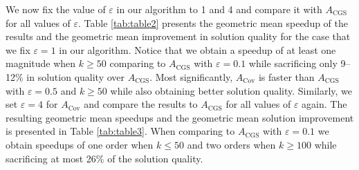         

    We now fix the value of $\varepsilon$ in our algorithm to 1 and 4 and compare it with $A_{\text{CGS}}$ for all values of $\varepsilon$. Table \ref{tab:table2} presents the geometric mean speedup of the results and the geometric mean improvement in solution quality for the case that we fix $\varepsilon = 1$ in our algorithm. Notice that we obtain a speedup of at least one magnitude when $k \geq 50$ comparing to $A_{\text{CGS}}$ with $\varepsilon = 0.1$ while sacrificing only 9--12\% in solution quality over $A_{\text{CGS}}$. Most significantly, $A_{\text{Cov}}$ is faster than $A_{\text{CGS}}$ with $\varepsilon = 0.5$ and $k \geq 50$ while also obtaining better solution quality. Similarly, we set $\varepsilon = 4$ for $A_{\text{Cov}}$ and compare the results to $A_{\text{CGS}}$ for all values of $\varepsilon$ again. The resulting geometric mean speedups and the geometric mean solution improvement is presented in Table \ref{tab:table3}. When comparing to $A_{\text{CGS}}$ with $\varepsilon = 0.1$ we obtain speedups of one order when $k \leq 50$ and two orders when $k \geq 100$ while sacrificing at most 26\% of the solution quality.